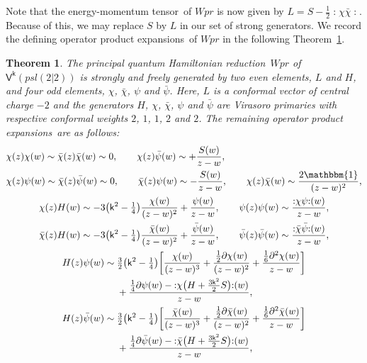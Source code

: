 \documentclass[10pt,a4paper]{amsart}
\numberwithin{equation}{section}
\newcommand{\pd}{\partial} %
\newcommand{\wun}{\mathbbm{1}} %
\newcommand{\bchi}{\bar{\chi}{}} %
\newcommand{\bpsi}{\bar{\psi}{}} %
\newcommand{\kk}{\mathsf{k}} %
\DeclarePairedDelimiter{\brac}{\lparen}{\rparen} %
\DeclarePairedDelimiter{\sqbrac}{\lbrack}{\rbrack} %
\newcommand{\no}[1]{\mathopen{:} #1 \mathclose{:}} %
\newcommand{\alg}[1]{\mathfrak{#1}} %
\newcommand{\VOA}[1]{\mathsf{#1}} %
\newcommand{\SLSA}[3]{\alg{#1}_{#2 \vert #3}} %
\newcommand{\psl}{\SLSA{psl}{2}{2}}
\newcommand{\uaff}[2]{\VOA{V}^{#1}(#2)} %
\newcommand{\upsl}[1][\kk]{\uaff{#1}{\psl}} %
\newcommand{\uwalg}[2]{\VOA{W}^{#1}_{\mathrm{#2}}} %
\newcommand{\upr}[1][\kk]{\uwalg{#1}{pr}} %
\newcommand{\emt}{energy-momentum tensor}
\newcommand{\ope}{operator product expansion}
\newcommand{\opes}{\ope s}
\newcommand{\qhr}{quantum Hamiltonian reduction} %
\newtheorem{Theorem}{Theorem}[section]
\def\smash#1{#1}
\def\psl{psl(2|2)}
\def\upr{Wpr}
\def\qhr{quantum Hamiltonian reduction}
\begin{document}
Note that the \emt\ of \smash{$\upr$} is now given by
$L = S - \frac{1}{2} \no{\chi\bchi}$.
Because of this, we may replace $S$ by $L$ in our set of strong generators.
We record the defining \opes\ of \smash{$\upr$} in the following Theorem~\ref{thm:propes}.
%
\begin{Theorem} \label{thm:propes}
	The principal \qhr\ \smash{$\upr$} of \smash{$\upsl$} is strongly and freely generated by two even elements, $L$ and $H$, and four odd elements, $\chi$, $\bchi$, $\psi$ and $\bpsi$.
	Here, $L$ is a conformal vector of central charge $-2$ and the generators $H$, $\chi$, $\bchi$, $\psi$ and $\bpsi$ are Virasoro primaries with respective conformal weights $2$, $1$, $1$, $2$ and $2$.
	The remaining \opes\ are as follows:
	\begin{subequations} \label{eq:opes}
		\begin{gather}
			\begin{aligned}
				&\chi(z) \chi(w) \sim \bchi(z) \bchi(w) \sim 0, \qquad
				\chi(z) \bpsi(w) \sim +\frac{S(w)}{z-w},
				\\
				&\chi(z) \psi(w) \sim \bchi(z) \bpsi(w) \sim 0, \qquad
				\bchi(z) \psi(w) \sim -\frac{S(w)}{z-w},\qquad
 \chi(z) \bchi(w) \sim \frac{2\wun}{(z-w)^2},
			\end{aligned}
			\\
			\begin{aligned}
				&\chi(z) H(w) \sim -3\brac*{\kk^2-\tfrac{1}{4}} \frac{\chi(w)}{(z-w)^2} + \frac{\psi(w)}{z-w}, \qquad
				\psi(z) \psi(w) \sim \frac{\no{\chi\psi}(w)}{z-w}, \\
				& \bchi(z) H(w) \sim -3\brac*{\kk^2-\tfrac{1}{4}} \frac{\bchi(w)}{(z-w)^2} + \frac{\bpsi(w)}{z-w}, \qquad
				 \bpsi(z) \bpsi(w) \sim \frac{\no{\bchi\bpsi}(w)}{z-w},
			\end{aligned}
			\\
			\begin{aligned}
				H(z) \psi(w) \sim{}& \tfrac{3}{2}\brac*{\kk^2-\tfrac{1}{4}} \sqbrac*{\frac{\chi(w)}{(z-w)^3} + \frac{\frac{1}{2}\pd\chi(w)}{(z-w)^2} + \frac{\frac{1}{6}\pd^2\chi(w)}{z-w}} \\
&+ \frac{\frac{1}{4}\pd\psi(w) - \no{\chi\big(H+\frac{3\kk^2}{2}S\big)}(w)}{z-w}, \\
				H(z) \bpsi(w) \sim{}& \tfrac{3}{2}\brac*{\kk^2-\tfrac{1}{4}} \sqbrac*{\frac{\bchi(w)}{(z-w)^3} + \frac{\frac{1}{2}\pd\bchi(w)}{(z-w)^2} + \frac{\frac{1}{6}\pd^2\bchi(w)}{z-w}}\\
& + \frac{\frac{1}{4}\pd\bpsi(w) - \no{\bchi\big(H+\frac{3\kk^2}{2}S\big)}(w)}{z-w},

\end{aligned}
\end{gather}
\end{subequations}
\end{Theorem}
\end{document}
